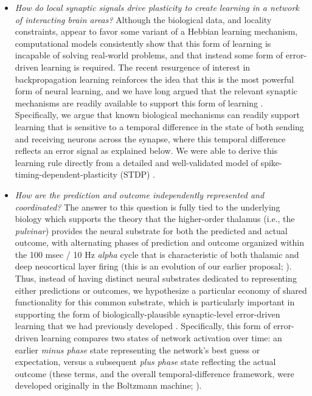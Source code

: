 \documentclass[11pt,twoside]{article}
\newif\myifpdf
\begin{document}
\begin{itemize}
\item {\em How do local synaptic signals drive plasticity to create learning in a network of interacting brain areas?}  Although the biological data, and locality constraints, appear to favor some variant of a Hebbian learning mechanism, computational models consistently show that this form of learning is incapable of solving real-world problems, and that instead some form of error-driven learning is required.  The recent resurgence of interest in backpropagation learning \cite{RumelhartHintonWilliams86} reinforces the idea that this is the most powerful form of neural learning, and we have long argued that the relevant synaptic mechanisms are readily available to support this form of learning \cite{OReilly96,OReillyHazyHerd15,OReillyMunakataFrankEtAl12,OReillyMunakata00}.  Specifically, we argue that known biological mechanisms can readily support learning that is sensitive to a temporal difference in the state of both sending and receiving neurons across the synapse, where this temporal difference reflects an error signal as explained below.  We were able to derive this learning rule directly from a detailed and well-validated model of spike-timing-dependent-plasticity (STDP) \cite{UrakuboHondaFroemkeEtAl08}.

\item {\em How are the prediction and outcome independently represented and coordinated?}  The answer to this question is fully tied to the underlying biology which supports the theory that the higher-order thalamus (i.e., the {\em pulvinar}) provides the neural substrate for both the predicted and actual outcome, with alternating phases of prediction and outcome organized within the 100 msec / 10 Hz {\em alpha} cycle that is characteristic of both thalamic and deep neocortical layer firing (this is an evolution of our earlier proposal; ). Thus, instead of having distinct neural substrates dedicated to representing either predictions or outcomes, we hypothesize a particular economy of shared functionality for this common substrate, which is particularly important in supporting the form of biologically-plausible synaptic-level error-driven learning that we had previously developed \cite{OReilly96}.  Specifically, this form of error-driven learning compares two states of network activation over time: an earlier {\em minus phase} state representing the network's best guess or expectation, versus a subsequent {\em plus phase} state reflecting the actual outcome (these terms, and the overall temporal-difference framework, were developed originally in the Boltzmann machine; ).


\end{itemize}
\end{document}
